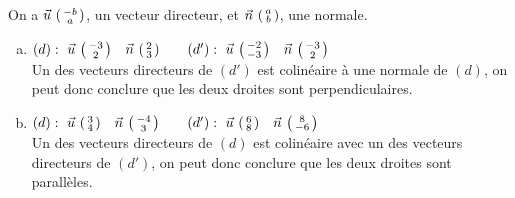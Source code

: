 \documentclass[12pt, a4paper]{article}
\begin{document}
    \begin{Exercise}[number={52}]
        On a $\vec{u}\ \begin{psmallmatrix}-b \\ a\end{psmallmatrix}$, un vecteur directeur, et $\vec{n}\ \begin{psmallmatrix}a \\ b\end{psmallmatrix}$, une normale.
        \begin{enumerate}[a)]
           \item	$(d):\ \vec{u}\ \begin{psmallmatrix}-3 \\ 2\end{psmallmatrix} \quad \vec{n}\ \begin{psmallmatrix}2 \\ 3\end{psmallmatrix} \qquad (d'):\ \vec{u}\ \begin{psmallmatrix}-2 \\ -3\end{psmallmatrix} \quad \vec{n}\ \begin{psmallmatrix}-3 \\ 2\end{psmallmatrix}$ \\ Un des vecteurs directeurs de $(d')$ est colinéaire à une normale de $(d)$, on peut donc conclure que les deux droites sont perpendiculaires.
           \item	$(d):\ \vec{u}\ \begin{psmallmatrix}3 \\ 4\end{psmallmatrix} \quad \vec{n}\ \begin{psmallmatrix}-4 \\ 3\end{psmallmatrix} \qquad (d'):\ \vec{u}\ \begin{psmallmatrix}6 \\ 8\end{psmallmatrix} \quad \vec{n}\ \begin{psmallmatrix}8 \\ -6\end{psmallmatrix}$ \\ Un des vecteurs directeurs de $(d)$ est colinéaire avec un des vecteurs directeurs de $(d')$, on peut donc conclure que les deux droites sont parallèles.
           \end{enumerate}	
    \end{Exercise}
\end{document}
